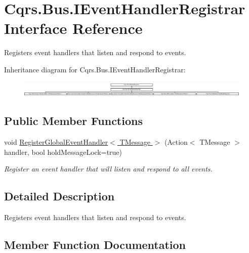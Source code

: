 \hypertarget{interfaceCqrs_1_1Bus_1_1IEventHandlerRegistrar}{}\section{Cqrs.\+Bus.\+I\+Event\+Handler\+Registrar Interface Reference}
\label{interfaceCqrs_1_1Bus_1_1IEventHandlerRegistrar}


Registers event handlers that listen and respond to events.  


Inheritance diagram for Cqrs.\+Bus.\+I\+Event\+Handler\+Registrar\+:\begin{figure}[H]
\begin{center}
\leavevmode
\includegraphics[height=0.763636cm]{interfaceCqrs_1_1Bus_1_1IEventHandlerRegistrar}
\end{center}
\end{figure}
\subsection*{Public Member Functions}
\begin{DoxyCompactItemize}
\item 
void \hyperlink{interfaceCqrs_1_1Bus_1_1IEventHandlerRegistrar_a80854abefd17bc58bd94e45266cf141e_a80854abefd17bc58bd94e45266cf141e}{Register\+Global\+Event\+Handler$<$ T\+Message $>$} (Action$<$ T\+Message $>$ handler, bool hold\+Message\+Lock=true)
\begin{DoxyCompactList}\small\item\em Register an event handler that will listen and respond to all events. \end{DoxyCompactList}\end{DoxyCompactItemize}


\subsection{Detailed Description}
Registers event handlers that listen and respond to events. 



\subsection{Member Function Documentation}
\mbox{\label{interfaceCqrs_1_1Bus_1_1IEventHandlerRegistrar_a80854abefd17bc58bd94e45266cf141e_a80854abefd17bc58bd94e45266cf141e}} 
